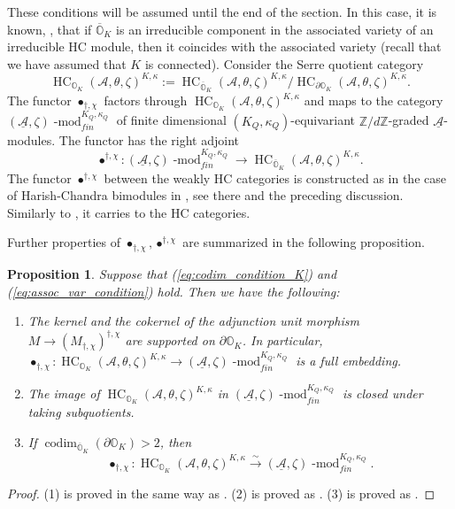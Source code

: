 \documentclass[12pt]{amsart}
\newcommand{\A}{\mathcal{A}}
\newcommand{\Orb}{\mathbb{O}}
\newcommand{\Z}{\mathbb{Z}}
\newcommand{\HC}{\operatorname{HC}}
\newtheorem{Prop}[Thm]{Proposition}
\theoremstyle{definition}
\numberwithin{equation}{section}
\begin{document}
These conditions will be assumed until the end of the section.
In this case, it is known, \cite[Theorem 1.3]{Vogan}, that if $\overline{\Orb}_K$
is an irreducible component in the associated variety of an irreducible
HC module, then it coincides with the associated variety (recall that we have assumed that $K$ is connected). Consider
the Serre quotient category
\begin{equation}\label{eq:quotient_cat}
\HC_{\Orb_K}(\A,\theta,\zeta)^{K,\kappa}:=\HC_{\overline{\Orb}_K}(\A,\theta,\zeta)^{K,\kappa}/\HC_{\partial\Orb_K}(\A,\theta,\zeta)^{K,\kappa}.
\end{equation}
The functor $\bullet_{\dagger,\chi}$ factors through $\HC_{\Orb_K}(\A,\theta,\zeta)^{K,\kappa}$ and
maps to the category $(\underline{\A},\zeta)\operatorname{-mod}^{K_Q,\kappa_Q}_{fin}$ of
finite dimensional $(K_Q,\kappa_Q)$-equivariant $\Z/d\Z$-graded $\underline{\A}$-modules.
The functor has the
right adjoint
$$\bullet^{\dagger,\chi}:(\underline{\A},\zeta)\operatorname{-mod}^{K_Q,\kappa_Q}_{fin}
\rightarrow \HC_{\overline{\Orb}_K}(\A,\theta,\zeta)^{K,\kappa}.$$
The functor $\bullet^{\dagger,\chi}$  between the weakly HC categories is constructed as in the case of Harish-Chandra bimodules in
\cite[Section 3.3]{HC}, see \cite[Proposition 3.3.4]{HC} there and the preceding discussion.
Similarly to \cite[Section 3.4]{HC}, it carries to the HC categories.

Further  properties of $\bullet_{\dagger,\chi},\bullet^{\dagger,\chi}$
are summarized in the following proposition.

\begin{Prop}\label{Prop:adj_properties}
Suppose that (\ref{eq:codim_condition_K}) and (\ref{eq:assoc_var_condition}) hold. Then we have the following:
\begin{enumerate}
\item The kernel and the cokernel of the adjunction unit morphism
$M\rightarrow (M_{\dagger,\chi})^{\dagger,\chi}$ are supported on $\partial\Orb_K$.
In particular, $\bullet_{\dagger,\chi}: \HC_{\Orb_K}(\A,\theta,\zeta)^{K,\kappa}\rightarrow (\underline{\A},\zeta)\operatorname{-mod}_{fin}^{K_Q,\kappa_Q}$ is a full embedding. 
\item The image of $\HC_{\Orb_K}(\A,\theta,\zeta)^{K,\kappa}$ in $(\underline{\A},\zeta)\operatorname{-mod}_{fin}^{K_Q,\kappa_Q}$
is closed under taking subquotients.
\item If $\operatorname{codim}_{\overline{\Orb}_K}(\partial\Orb_K)>2$,
then $$\bullet_{\dagger,\chi}: \HC_{\Orb_K}(\A,\theta,\zeta)^{K,\kappa}\xrightarrow{\sim} (\underline{\A},\zeta)\operatorname{-mod}_{fin}^{K_Q,\kappa_Q}.$$
\end{enumerate}
\end{Prop}
\begin{proof}
(1) is proved in the same way as \cite[Proposition 3.4.1(5)]{HC}. (2) is proved as
\cite[Theorem 4.1.1]{HC}. (3) is proved as \cite[Theorem 4.4]{reg}.
\end{proof}
\end{document}
